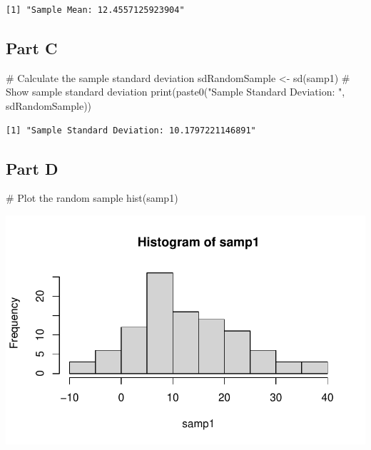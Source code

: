 \documentclass[
  letterpaper,
  DIV=11,
  numbers=noendperiod]{scrartcl}
\newenvironment{Shaded}{}{}
\newcommand{\CommentTok}[1]{\textcolor[rgb]{0.57,0.51,0.45}{#1}}
\newcommand{\FunctionTok}[1]{\textcolor[rgb]{0.41,0.62,0.42}{#1}}
\newcommand{\NormalTok}[1]{\textcolor[rgb]{0.24,0.22,0.21}{#1}}
\newcommand{\OtherTok}[1]{\textcolor[rgb]{0.41,0.62,0.42}{#1}}
\newcommand{\StringTok}[1]{\textcolor[rgb]{0.60,0.59,0.10}{#1}}
\begin{document}
\begin{verbatim}
[1] "Sample Mean: 12.4557125923904"
\end{verbatim}

\newpage{}

\subsection{Part C}\label{part-c}

\begin{Shaded}
\begin{Highlighting}[]
\CommentTok{\# Calculate the sample standard deviation}
\NormalTok{sdRandomSample }\OtherTok{\textless{}{-}} \FunctionTok{sd}\NormalTok{(samp1)}
\CommentTok{\# Show sample standard deviation}
\FunctionTok{print}\NormalTok{(}\FunctionTok{paste0}\NormalTok{(}\StringTok{"Sample Standard Deviation: "}\NormalTok{, sdRandomSample))}
\end{Highlighting}
\end{Shaded}

\begin{verbatim}
[1] "Sample Standard Deviation: 10.1797221146891"
\end{verbatim}

\newpage{}

\subsection{Part D}\label{part-d}

\begin{Shaded}
\begin{Highlighting}[]
\CommentTok{\# Plot the random sample}
\FunctionTok{hist}\NormalTok{(samp1)}
\end{Highlighting}
\end{Shaded}

\includegraphics{CervantesAlvarez_Brian_HW0_ST551_files/figure-pdf/unnamed-chunk-4-1.pdf}
\end{document}
